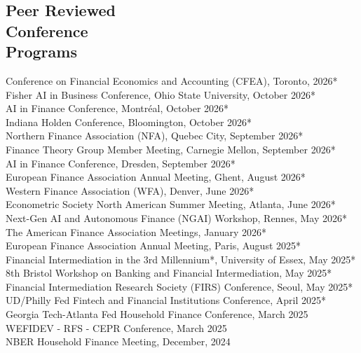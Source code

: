 \documentclass[margin,line,11pt]{resume}
\begin{document}
\begin{resume}
\section{\mysidestyle Peer Reviewed \\Conference \\Programs}
 Conference on Financial Economics and Accounting (CFEA), Toronto, 2026* \\%
 Fisher AI in Business Conference, Ohio State University, October 2026* \\%
 AI in Finance Conference, Montr\'{e}al, October 2026* \\%
 Indiana Holden Conference, Bloomington, October 2026* \\%
 Northern Finance Association (NFA), Quebec City, September 2026* \\%
 Finance Theory Group Member Meeting, Carnegie Mellon, September 2026* \\%
 AI in Finance Conference, Dresden, September 2026* \\%
 European Finance Association Annual Meeting, Ghent, August 2026* \\%
 Western Finance Association (WFA), Denver, June 2026* \\%
 Econometric Society North American Summer Meeting, Atlanta, June 2026* \\%
 Next-Gen AI and Autonomous Finance (NGAI) Workshop, Rennes, May 2026* \\%
 The American Finance Association Meetings, January 2026* \\%
 European Finance Association Annual Meeting, Paris, August 2025* \\%
 Financial Intermediation in the 3rd Millennium*, University of Essex, May 2025* \\%
 8th Bristol Workshop on Banking and Financial Intermediation,  May 2025* \\ %
Financial Intermediation Research Society (FIRS) Conference, Seoul, May 2025* \\%
 UD/Philly Fed Fintech and Financial Institutions Conference, April 2025* \\%
Georgia Tech-Atlanta Fed Household Finance Conference, March 2025 \\%
WEFIDEV - RFS - CEPR Conference, March 2025 \\%
NBER Household Finance Meeting, December, 2024 \\%

\end{resume}
\end{document}

